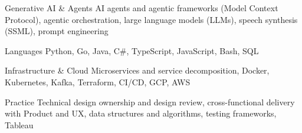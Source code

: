 
\begin{cvskills}
  \cvskill
    {Generative AI \& Agents} %
    {AI agents and agentic frameworks (Model Context Protocol), agentic orchestration, large language models (LLMs), speech synthesis (SSML), prompt engineering} %

  \cvskill
    {Languages} %
    {Python, Go, Java, C\#, TypeScript, JavaScript, Bash, SQL} %

  \cvskill
    {Infrastructure \& Cloud} %
    {Microservices and service decomposition, Docker, Kubernetes, Kafka, Terraform, CI/CD, GCP, AWS} %

  \cvskill
    {Practice} %
    {Technical design ownership and design review, cross-functional delivery with Product and UX, data structures and algorithms, testing frameworks, Tableau} %

\end{cvskills}
